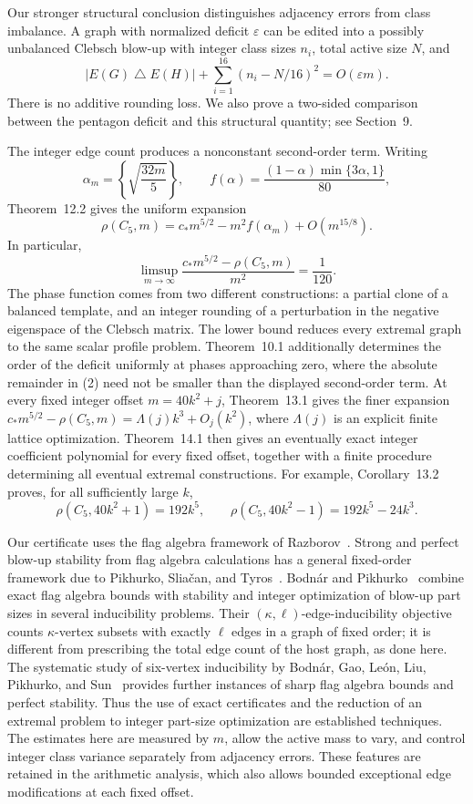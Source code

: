 \documentclass[11pt]{amsart}
\theoremstyle{definition}
\theoremstyle{remark}
\begin{document}
Our stronger structural conclusion distinguishes adjacency errors from
class imbalance. A graph with normalized deficit \(\varepsilon\) can be
edited into a possibly unbalanced Clebsch blow-up with integer class sizes
\(n_i\), total active size \(N\), and
\[
 |E(G)\mathbin{\triangle}E(H)|
       +\sum_{i=1}^{16}(n_i-N/16)^2=O(\varepsilon m).
\]
There is no additive rounding loss. We also prove a two-sided comparison
between the pentagon deficit and this structural quantity; see Section~9.

The integer edge count produces a nonconstant second-order term. Writing
\[
 \alpha_m=\left\{\sqrt{\frac{32m}{5}}\right\},\qquad
 f(\alpha)=\frac{(1-\alpha)\min\{3\alpha,1\}}{80},
\]
Theorem~12.2 gives the uniform expansion
\begin{equation}
 \rho(C_5,m)=c_*m^{5/2}-m^2f(\alpha_m)+O(m^{15/8}).\tag{2}
\end{equation}
In particular,
\[
 \limsup_{m\to\infty}\frac{c_*m^{5/2}-\rho(C_5,m)}{m^2}
 =\frac1{120}.
\]
The phase function comes from two different constructions: a partial clone
of a balanced template, and an integer rounding of a perturbation in the
negative eigenspace of the Clebsch matrix. The lower bound reduces every
extremal graph to the same scalar profile problem. Theorem~10.1 additionally
determines the order of the deficit uniformly at phases approaching zero,
where the absolute remainder in (2) need not be smaller than the displayed
second-order term. At every fixed integer offset \(m=40k^2+j\),
Theorem~13.1 gives the finer expansion
\(c_*m^{5/2}-\rho(C_5,m)=\Lambda(j)k^3+O_j(k^2)\), where \(\Lambda(j)\) is
an explicit finite lattice optimization. Theorem~14.1 then gives an
eventually exact integer coefficient polynomial for every fixed offset,
together with a finite procedure determining all eventual extremal
constructions. For example, Corollary~13.2 proves, for all sufficiently
large \(k\),
\[
 \rho(C_5,40k^2+1)=192k^5,\qquad
 \rho(C_5,40k^2-1)=192k^5-24k^3.
\]

Our certificate uses the flag algebra framework of Razborov~\cite{Razborov2007}.
Strong and perfect blow-up stability from flag algebra calculations has a
general fixed-order framework due to Pikhurko, Slia\v{c}an, and
Tyros~\cite{Pikhurko2019}. Bodn\'ar and Pikhurko~\cite{BodnarPikhurko2026}
combine exact flag algebra bounds with stability and integer optimization
of blow-up part sizes in several inducibility problems. Their
$(\kappa,\ell)$-edge-inducibility objective counts $\kappa$-vertex subsets
with exactly $\ell$ edges in a graph of fixed order; it is different from
prescribing the total edge count of the host graph, as done here.
The systematic study of six-vertex inducibility by Bodn\'ar, Gao,
Le\'on, Liu, Pikhurko, and Sun~\cite{BodnarEtAl2026Six} provides further
instances of sharp flag algebra bounds and perfect stability.
Thus the use of exact certificates and the reduction of an extremal
problem to integer part-size optimization are established techniques.
The estimates here are measured by $m$, allow the active mass to vary,
and control integer class variance separately from adjacency errors.
These features are retained in the arithmetic analysis, which also allows
bounded exceptional edge modifications at each fixed offset.
\end{document}
